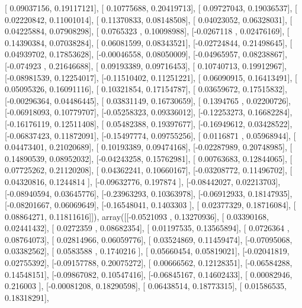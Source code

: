 \documentclass{article}
\begin{document}
       [ 0.09037156,  0.19117121],
       [ 0.10775688,  0.20419713],
       [ 0.09727043,  0.19036537],
       [ 0.02220842,  0.11001014],
       [ 0.11370833,  0.08148508],
       [ 0.04023052,  0.06328031],
       [ 0.04225884,  0.07908298],
       [ 0.0765323 ,  0.10098988],
       [-0.0267118 ,  0.02476169],
       [ 0.14390384,  0.07038284],
       [ 0.06081599,  0.08343521],
       [-0.02724844,  0.21498645],
       [ 0.04939702,  0.17853628],
       [-0.00046558,  0.08050009],
       [-0.04965957,  0.08238867],
       [-0.074923  ,  0.21646688],
       [ 0.09193389,  0.09716453],
       [ 0.10740713,  0.19912967],
       [-0.08981539,  0.12254017],
       [-0.11510402,  0.11251221],
       [ 0.06090915,  0.16413491],
       [ 0.05095326,  0.16091116],
       [ 0.10321854,  0.17154787],
       [ 0.03659672,  0.17515832],
       [-0.00296364,  0.04486445],
       [ 0.03831149,  0.16730659],
       [ 0.1394765 ,  0.02200726],
       [-0.06918093,  0.10779707],
       [-0.05258323,  0.09336012],
       [-0.12253273,  0.16682284],
       [-0.16176119,  0.12511408],
       [ 0.05482388,  0.19397677],
       [-0.16949612,  0.03428522],
       [-0.06837423,  0.11872091],
       [-0.15497774,  0.09755256],
       [ 0.0116871 ,  0.05968944],
       [ 0.04473401,  0.21020689],
       [ 0.10193389,  0.09474168],
       [-0.02287989,  0.20748985],
       [ 0.14890539,  0.08952032],
       [-0.04243258,  0.15762981],
       [ 0.00763683,  0.12844065],
       [ 0.07725262,  0.21120208],
       [ 0.04362241,  0.10660167],
       [-0.03208772,  0.11496702],
       [ 0.04320816,  0.1244814 ],
       [-0.09632776,  0.197874  ],
       [-0.08442027,  0.02213703],
       [-0.08940594,  0.03645776],
       [-0.23963293,  0.10363978],
       [-0.06912933,  0.18147935],
       [-0.08201667,  0.06069649],
       [-0.16548041,  0.1403303 ],
       [ 0.02377329,  0.18716084],
       [ 0.08864271,  0.11811616]]), array([[-0.0521093 ,  0.13270936],
       [ 0.03390168,  0.02441432],
       [ 0.0272359 ,  0.08682354],
       [ 0.01197535,  0.13565894],
       [ 0.0726364 ,  0.08764073],
       [ 0.02814966,  0.06059776],
       [ 0.03524869,  0.11459474],
       [-0.07095068,  0.03382562],
       [ 0.0583588 ,  0.1740216 ],
       [ 0.05660454,  0.05819021],
       [-0.02041819,  0.02755392],
       [-0.09157788,  0.20075272],
       [ 0.00666562,  0.12128351],
       [-0.06584288,  0.14548151],
       [-0.09867082,  0.10547416],
       [-0.06845167,  0.14602433],
       [ 0.00082946,  0.216003  ],
       [-0.00081208,  0.18290598],
       [ 0.06438514,  0.18773315],
       [ 0.01586535,  0.18318291],
\end{document}
